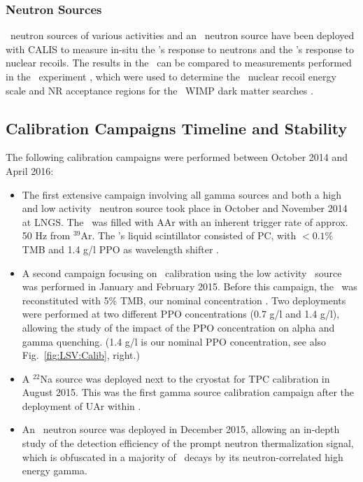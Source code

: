 \subsubsection{Neutron Sources}
\AmBe\ neutron sources of various activities and an \AmC\ neutron source have been deployed with CALIS to measure in-situ the \lsv's response to neutrons and the \tpc's response to nuclear recoils. The results in the \tpc\ can be compared to measurements performed in the \SCENE\ experiment \cite{Alexander:2013ke, Cao:2015ks}, which were used to determine the \tpc\ nuclear recoil energy scale and NR acceptance regions for the \dsf\ WIMP dark matter searches \cite{Agnes:2015gu, Agnes:2015_uar}.

\subsection{Calibration Campaigns Timeline and Stability}
The following calibration campaigns were performed between October 2014 and April 2016:
\begin{itemize}
\item The first extensive campaign involving all gamma sources and both a high and low activity \AmBe\ neutron source took place in October and November 2014 at LNGS. The \tpc\ was filled with AAr with an inherent trigger rate of approx. 50 Hz from $^{39}$Ar. The \lsv's liquid scintillator consisted of PC, with $<0.1 \%$ TMB and 1.4 g/l PPO as wavelength shifter \cite{Agnes:2015qyz}.

\item A second campaign focusing on \lsv\ calibration using the low activity \AmBe\ source was performed in January and February 2015. Before this campaign, the \lsv\ was reconstituted with 5\% TMB, our nominal concentration \cite{Agnes:2015qyz}. Two deployments were performed at two different PPO concentrations (0.7 g/l and 1.4 g/l), allowing the study of the impact of the PPO concentration on alpha and gamma quenching. (1.4 g/l is our nominal PPO concentration, see also Fig.~\ref{fig:LSV:Calib}, right.)
\item A $^{22}$Na source was deployed next to the cryostat for TPC calibration in August 2015. This was the first gamma source calibration campaign after the deployment of UAr within \dsf.
\item An \AmC\ neutron source was deployed in December 2015, allowing an in-depth study of the detection efficiency of the prompt neutron thermalization signal, which is obfuscated in a majority of \AmBe\ decays by its neutron-correlated high energy gamma.
\end{itemize}

